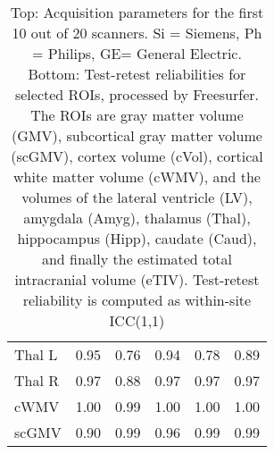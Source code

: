 \begin{table}
\begin{tabular}{llllll}
Thal L                &                   0.95 &               0.76 &                               0.94 &                    0.78 &                        0.89 \\
Thal R                &                   0.97 &               0.88 &                               0.97 &                    0.97 &                        0.97 \\
cWMV                  &                   1.00 &               0.99 &                               1.00 &                    1.00 &                        1.00 \\
scGMV                 &                   0.90 &               0.99 &                               0.96 &                    0.99 &                        0.99 \\
\bottomrule
\end{tabular}

\caption{Top: Acquisition parameters for the first 10 out of 20 scanners. Si = Siemens, Ph = Philips, GE= General Electric. Bottom: Test-retest reliabilities for selected ROIs, processed by Freesurfer. The ROIs are gray matter volume (GMV), subcortical gray matter volume (scGMV), cortex volume (cVol), cortical white matter volume (cWMV), and the volumes of the lateral ventricle (LV), amygdala (Amyg), thalamus (Thal), hippocampus (Hipp), caudate (Caud), and finally the estimated total intracranial volume (eTIV). Test-retest reliability is computed as within-site ICC(1,1)} 
\label{tab:acquisition1}

\end{table}
